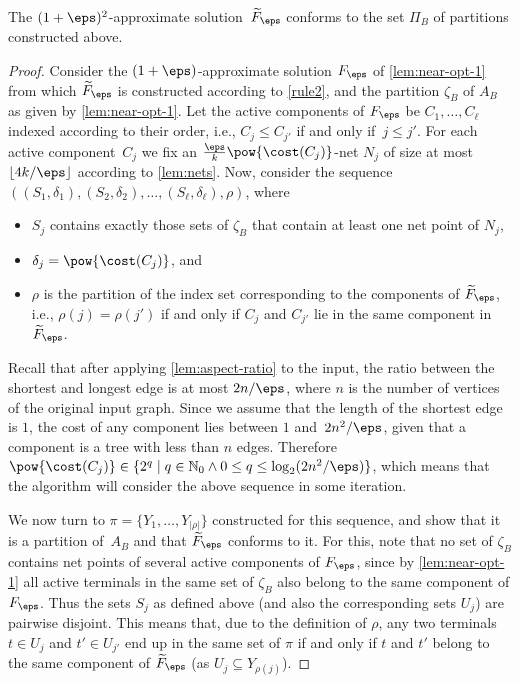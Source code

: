 \begin{lemma}
The $(1+\eps)^2$-approximate solution~$\widetilde{F}_\eps$ conforms to the set $\Pi_B$ of partitions constructed above.
\end{lemma}
\begin{proof}
Consider the $(1+\eps)$-approximate solution $F_\eps$ of \autoref{lem:near-opt-1} from which $\widetilde{F}_\eps$ is constructed 
according to \autoref{rule2}, and the partition $\zeta_B$ of $A_B$ as given by \autoref{lem:near-opt-1}. Let the active components of 
$F_\eps$ be $C_1,\ldots,C_\ell$ indexed according to their order, i.e., $C_j\leq C_{j'}$ if and only if~$j\leq  j'$.
For each active component~$C_j$ we fix an $\frac{\eps}{k}\pow{\cost(C_j)}$-net $N_j$ of size at most~$\lfloor 4k/\eps\rfloor$
according to \autoref{lem:nets}. Now, consider the sequence $((S_1,\delta_1),(S_2,\delta_2),\ldots,(S_\ell,\delta_\ell),\rho)$, where
\begin{itemize}
    \item $S_j$ contains exactly those sets of $\zeta_B$ that contain at least one net point of $N_j$,
    \item $\delta_j=\pow{\cost(C_j)}$, and
    \item $\rho$ is the partition of the index set corresponding to the components of $\widetilde{F}_\eps$, i.e., $\rho(j)=\rho(j')$ if and only if $C_j$ and $C_{j'}$ lie in the same component in $\widetilde{F}_\eps$.
\end{itemize}

Recall that after applying \autoref{lem:aspect-ratio} to the input, the ratio between the shortest and longest edge 
is at most $2n/\eps$, where $n$ is the number of vertices of the original input graph.
Since we assume that the length of the shortest edge is $1$, the cost of any component lies between $1$ and~$2n^2/\eps$, 
given that a component is a tree with less than $n$ edges. Therefore $\pow{\cost(C_j)}\in\{2^q\mid q\in\mathbb{N}_0\land 0\leq q\leq \log_2(2n^2/\eps)\}$, which means that the algorithm will consider the above sequence in some iteration.

We now turn to $\pi=\{Y_1,\ldots,Y_{|\rho|}\}$ constructed for this sequence, and show that it is a partition of~$A_B$ and that $\widetilde{F}_\eps$ conforms to it.
For this, note that no set of $\zeta_B$ contains net points of several active components of $F_\eps$,
since by \autoref{lem:near-opt-1} all active terminals in the same set of $\zeta_B$ also belong to the same component of $F_\eps$.
Thus the sets $S_j$ as defined above (and also the corresponding sets $U_j$) are pairwise disjoint. 
This means that, due to the definition of $\rho$, any two terminals $t\in U_j$ and $t'\in U_{j'}$ end up in the same set
of $\pi$ if and only if $t$ and $t'$ belong to the same component of $\widetilde{F}_\eps$ (as $U_j\subseteq Y_{\rho(j)}$).


\end{proof}
